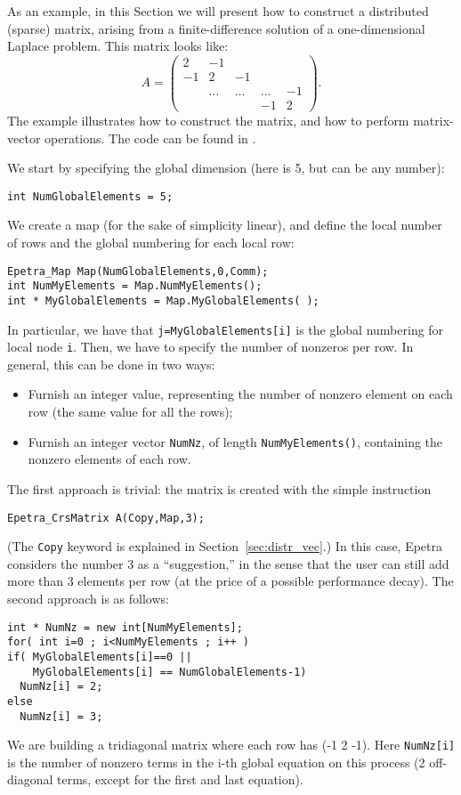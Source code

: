 As an example, in this Section we will present how to construct a
distributed (sparse) matrix, arising from a finite-difference solution
of a one-dimensional Laplace problem. This matrix looks like:
\begin{equation*}
A = \begin{pmatrix}
 2 & -1 &     &   &    \\
-1 &  2     & -1     &        &    \\
   & \ldots & \ldots & \ldots & -1 \\
   &        &        & -1     & 2
\end{pmatrix}.
\end{equation*}
The example illustrates how to construct the matrix,
and how to perform matrix-vector operations.
The code can be found in .

We start by specifying the global dimension (here is 5, but can be any
number):
\begin{verbatim}
int NumGlobalElements = 5;
\end{verbatim}
We create a map (for the sake of simplicity linear), and define the
local number of rows and the global numbering for each local row:
\begin{verbatim}
Epetra_Map Map(NumGlobalElements,0,Comm);
int NumMyElements = Map.NumMyElements();
int * MyGlobalElements = Map.MyGlobalElements( );
\end{verbatim}
In particular, we have that \verb!j=MyGlobalElements[i]! is the global
numbering for local node \verb!i!.  Then, we have to specify the number
of nonzeros per row. In general, this can be done in two ways:
\begin{itemize}
\item Furnish an integer value, representing the number of nonzero
  element on each row (the same value for all the rows);
\item Furnish an integer vector \verb!NumNz!, of length
  \verb!NumMyElements()!, containing the nonzero elements of each row.
\end{itemize}

The first approach is trivial: the matrix is created with the simple
instruction
\begin{verbatim}
Epetra_CrsMatrix A(Copy,Map,3);
\end{verbatim}
(The \verb!Copy! keyword is explained in Section~\ref{sec:distr_vec}.)
In this case, Epetra considers the number 3 as a ``suggestion,'' in the
sense that the user can still add more than 3 elements per row (at the
price of a possible performance decay).  The second approach is as
follows:
\begin{verbatim}
int * NumNz = new int[NumMyElements];
for( int i=0 ; i<NumMyElements ; i++ )
if( MyGlobalElements[i]==0 || 
    MyGlobalElements[i] == NumGlobalElements-1)
  NumNz[i] = 2;
else
  NumNz[i] = 3;
\end{verbatim}
We are building a tridiagonal matrix where each row has (-1 2 -1).  Here
\verb!NumNz[i]! is the number of nonzero terms in the i-th global
equation on this process (2 off-diagonal terms, except for the first and
last equation).

